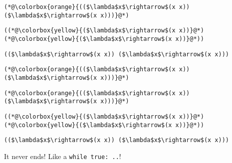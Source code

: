 \documentclass{beamer}
\begin{document}
\begin{frame}[fragile]{\CurrentSection}
\lstset{basicstyle=\ttfamily\small}\lstset{numbers=none}\lstset{language=ML}\begin{lstlisting}
(*@\colorbox{orange}{(($\lambda$x$\rightarrow$(x x)) ($\lambda$x$\rightarrow$(x x)))}@*)
\end{lstlisting}
\pause\lstset{language=ML}\begin{lstlisting}
((*@\colorbox{yellow}{($\lambda$x$\rightarrow$(x x))}@*) (*@\colorbox{yellow}{($\lambda$x$\rightarrow$(x x))}@*))
\end{lstlisting}

\end{frame}

\begin{frame}[fragile]{\CurrentSection}
\lstset{basicstyle=\ttfamily\small}\lstset{numbers=none}\lstset{language=ML}\begin{lstlisting}
(($\lambda$x$\rightarrow$(x x)) ($\lambda$x$\rightarrow$(x x)))
\end{lstlisting}
\pause\lstset{language=ML}\begin{lstlisting}
(*@\colorbox{orange}{(($\lambda$x$\rightarrow$(x x)) ($\lambda$x$\rightarrow$(x x)))}@*)
\end{lstlisting}

\end{frame}

\begin{frame}[fragile]{\CurrentSection}
\lstset{basicstyle=\ttfamily\small}\lstset{numbers=none}\lstset{language=ML}\begin{lstlisting}
(*@\colorbox{orange}{(($\lambda$x$\rightarrow$(x x)) ($\lambda$x$\rightarrow$(x x)))}@*)
\end{lstlisting}
\pause\lstset{language=ML}\begin{lstlisting}
((*@\colorbox{yellow}{($\lambda$x$\rightarrow$(x x))}@*) (*@\colorbox{yellow}{($\lambda$x$\rightarrow$(x x))}@*))
\end{lstlisting}

\end{frame}

\begin{frame}[fragile]{\CurrentSection}
\lstset{basicstyle=\ttfamily\small}\lstset{numbers=none}\lstset{language=ML}\begin{lstlisting}
(($\lambda$x$\rightarrow$(x x)) ($\lambda$x$\rightarrow$(x x)))
\end{lstlisting}
 
\begin{exampleblock}{}
It never ends! Like a \texttt{while true: ..}!
\end{exampleblock}

 

\end{frame}
\end{document}

